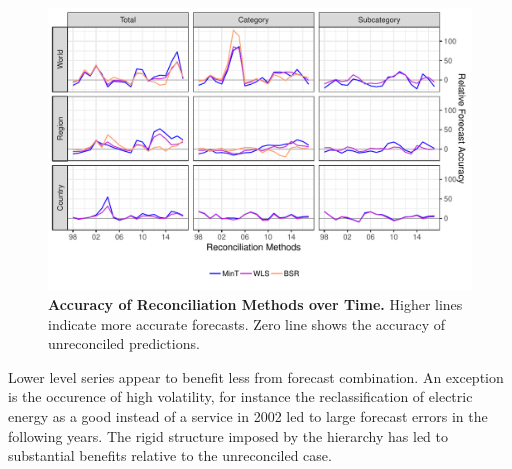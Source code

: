 \documentclass[a4paper,fleqn,11pt]{article}
\begin{document}
 \begin{figure}[H]
	\includegraphics[width=\textwidth]{fig/fig_eval_rmse_time}
	\caption[Accuracy of Reconciliation Methods over Time]{\textbf{Accuracy of Reconciliation Methods over Time.} Higher lines indicate more accurate forecasts. Zero line shows the accuracy of unreconciled predictions.} \label{fig:rmse_time}
\end{figure}
Lower level series appear to benefit less from forecast combination. An exception is the occurence of high volatility, for instance the reclassification of electric energy as a good instead of a service in 2002 led to large forecast errors in the following years. The rigid structure imposed by the hierarchy has led to substantial benefits relative to the unreconciled case.\\
\end{document}
